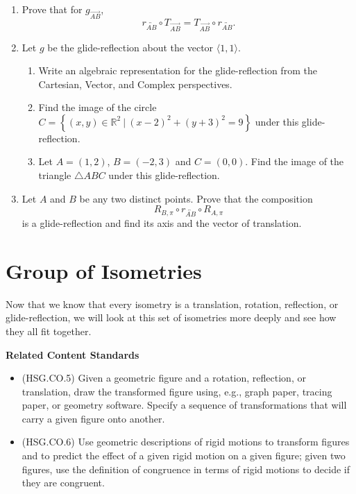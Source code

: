 \documentclass[
]{book}
\providecommand{\tightlist}{%
  \setlength{\itemsep}{0pt}\setlength{\parskip}{0pt}}
\newenvironment{standards}{}{}
\theoremstyle{definition}
\theoremstyle{definition}
\theoremstyle{definition}
\theoremstyle{definition}
\theoremstyle{remark}
\begin{document}
\begin{enumerate}
\def\labelenumi{\arabic{enumi}.}
\item
  Prove that for \(g_{\overrightarrow{AB}}\), \[r_{\overleftrightarrow{AB}}\circ T_{\overrightarrow{AB}} =  T_{\overrightarrow{AB}} \circ r_{\overleftrightarrow{AB}}.\]
\item
  Let \(g\) be the glide-reflection about the vector \(\langle 1,1\rangle\).

  \begin{enumerate}
  \def\labelenumii{\alph{enumii}.}
  \tightlist
  \item
    Write an algebraic representation for the glide-reflection from the Cartesian, Vector, and Complex perspectives.
  \item
    Find the image of the circle \(C=\left\{ (x,y)\in \mathbb{R}^2 \: \vert \: (x-2)^2+(y+3)^2 =9\right\}\) under this glide-reflection.
  \item
    Let \(A=(1,2)\), \(B=(-2,3)\) and \(C=(0,0)\). Find the image of the triangle \(\triangle ABC\) under this glide-reflection.
  \end{enumerate}
\item
  Let \(A\) and \(B\) be any two distinct points. Prove that the composition \[R_{B,\pi} \circ r_{\overleftrightarrow{AB}}\circ R_{A,\pi}\] is a glide-reflection and find its axis and the vector of translation.
\end{enumerate}

\hypertarget{group-of-isometries}{%
\section{Group of Isometries}\label{group-of-isometries}}

Now that we know that every isometry is a translation, rotation, reflection, or glide-reflection, we will look at this set of isometries more deeply and see how they all fit together.

\begin{standards}

\begin{center}
\textbf{Related Content Standards}

\end{center}

\begin{itemize}
\tightlist
\item
  (HSG.CO.5) Given a geometric figure and a rotation, reflection, or translation, draw the transformed figure using, e.g., graph paper, tracing paper, or geometry software. Specify a sequence of transformations that will carry a given figure onto another.
\item
  (HSG.CO.6) Use geometric descriptions of rigid motions to transform figures and to predict the effect of a given rigid motion on a given figure; given two figures, use the definition of congruence in terms of rigid motions to decide if they are congruent.
\end{itemize}

\end{standards}
\end{document}

